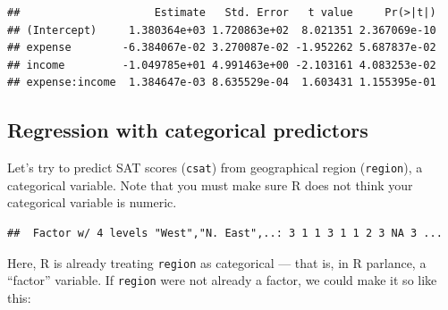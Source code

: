\documentclass[
]{book}
\newenvironment{Shaded}{\begin{snugshade}}{\end{snugshade}}
\newcommand{\CommentTok}[1]{\textcolor[rgb]{0.56,0.35,0.01}{\textit{#1}}}
\newcommand{\DataTypeTok}[1]{\textcolor[rgb]{0.13,0.29,0.53}{#1}}
\newcommand{\KeywordTok}[1]{\textcolor[rgb]{0.13,0.29,0.53}{\textbf{#1}}}
\newcommand{\NormalTok}[1]{#1}
\newcommand{\OperatorTok}[1]{\textcolor[rgb]{0.81,0.36,0.00}{\textbf{#1}}}
\newcommand{\StringTok}[1]{\textcolor[rgb]{0.31,0.60,0.02}{#1}}
\begin{document}
\begin{verbatim}
##                     Estimate   Std. Error   t value     Pr(>|t|)
## (Intercept)     1.380364e+03 1.720863e+02  8.021351 2.367069e-10
## expense        -6.384067e-02 3.270087e-02 -1.952262 5.687837e-02
## income         -1.049785e+01 4.991463e+00 -2.103161 4.083253e-02
## expense:income  1.384647e-03 8.635529e-04  1.603431 1.155395e-01
\end{verbatim}

\hypertarget{regression-with-categorical-predictors}{%
\subsection{Regression with categorical predictors}\label{regression-with-categorical-predictors}}

Let's try to predict SAT scores (\texttt{csat}) from geographical region (\texttt{region}), a categorical variable. Note that you must make sure R does not think your categorical variable is numeric.

\begin{Shaded}
\end{Shaded}

\begin{verbatim}
##  Factor w/ 4 levels "West","N. East",..: 3 1 1 3 1 1 2 3 NA 3 ...
\end{verbatim}

Here, R is already treating \texttt{region} as categorical --- that is, in R parlance, a ``factor'' variable. If \texttt{region} were not already a factor, we could make it so like this:

\begin{Shaded}
\end{Shaded}
\end{document}
